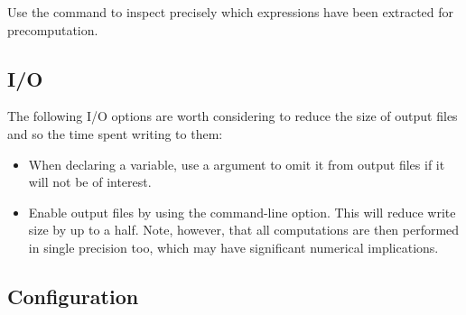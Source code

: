 \begin{tip}
Use the  command to inspect precisely which expressions
have been extracted for precomputation.
\end{tip}

\subsection{I/O}

The following I/O options are worth considering to reduce the size of output
files and so the time spent writing to them:
\begin{itemize}
\item When declaring a variable, use a  argument to omit
  it from output files if it will not be of interest.
\item Enable  output files by using the
   command-line option. This will reduce write size by
  up to a half. Note, however, that all computations are then performed in
  single precision too, which may have significant numerical implications.
\end{itemize}

\subsection{Configuration}

